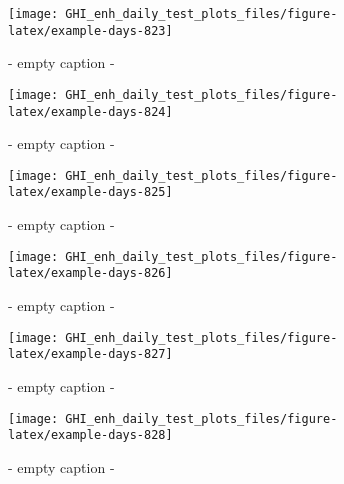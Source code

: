 \documentclass[
  10pt,
  a4paper,oneside]{article}
\begin{document}
\begin{figure}[H]

{\centering \texttt{[image: GHI\_enh\_daily\_test\_plots\_files/figure-latex/example-days-823]} 

}

\caption{ - empty caption - }\label{fig:example-days-823}
\end{figure}

\begin{figure}[H]

{\centering \texttt{[image: GHI\_enh\_daily\_test\_plots\_files/figure-latex/example-days-824]} 

}

\caption{ - empty caption - }\label{fig:example-days-824}
\end{figure}

\begin{figure}[H]

{\centering \texttt{[image: GHI\_enh\_daily\_test\_plots\_files/figure-latex/example-days-825]} 

}

\caption{ - empty caption - }\label{fig:example-days-825}
\end{figure}

\begin{figure}[H]

{\centering \texttt{[image: GHI\_enh\_daily\_test\_plots\_files/figure-latex/example-days-826]} 

}

\caption{ - empty caption - }\label{fig:example-days-826}
\end{figure}

\begin{figure}[H]

{\centering \texttt{[image: GHI\_enh\_daily\_test\_plots\_files/figure-latex/example-days-827]} 

}

\caption{ - empty caption - }\label{fig:example-days-827}
\end{figure}

\begin{figure}[H]

{\centering \texttt{[image: GHI\_enh\_daily\_test\_plots\_files/figure-latex/example-days-828]} 

}

\caption{ - empty caption - }\label{fig:example-days-828}
\end{figure}
\end{document}
